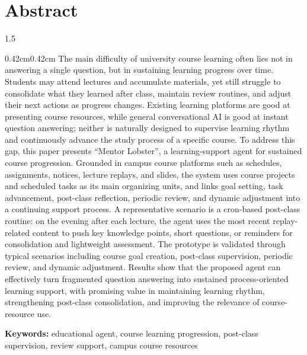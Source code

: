 \documentclass[zihao=-4]{ctexart}
\begin{document}
\section*{\textbf{Abstract}}
\begin{spacing}{1.5}
\begin{adjustwidth}{0.42cm}{0.42cm}
\qquad The main difficulty of university course learning often lies not in answering a single question, but in sustaining learning progress over time. Students may attend lectures and accumulate materials, yet still struggle to consolidate what they learned after class, maintain review routines, and adjust their next actions as progress changes. Existing learning platforms are good at presenting course resources, while general conversational AI is good at instant question answering; neither is naturally designed to supervise learning rhythm and continuously advance the study process of a specific course. To address this gap, this paper presents ``Mentor Lobster'', a learning-support agent for sustained course progression. Grounded in campus course platforms such as schedules, assignments, notices, lecture replays, and slides, the system uses course projects and scheduled tasks as its main organizing units, and links goal setting, task advancement, post-class reflection, periodic review, and dynamic adjustment into a continuing support process. A representative scenario is a cron-based post-class routine: on the evening after each lecture, the agent uses the most recent replay-related content to push key knowledge points, short questions, or reminders for consolidation and lightweight assessment. The prototype is validated through typical scenarios including course goal creation, post-class supervision, periodic review, and dynamic adjustment. Results show that the proposed agent can effectively turn fragmented question answering into sustained process-oriented learning support, with promising value in maintaining learning rhythm, strengthening post-class consolidation, and improving the relevance of course-resource use.

\textbf{Keywords:} educational agent, course learning progression, post-class supervision, review support, campus course resources
\end{adjustwidth}
\end{spacing}

\clearpage
\tableofcontents
\clearpage

\renewcommand{\headrulewidth}{0.4pt}
\setcounter{page}{1}
\end{document}
